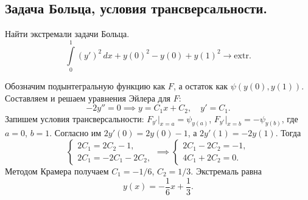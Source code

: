 \subsection{Задача Больца, условия трансверсальности.}
\begin{example}
  Найти экстремали задачи Больца. 
  \[
    \int\limits_{0}^{1} (y')^2\,dx + y(0)^2 - y(0) + y(1)^2 \to \mathrm{extr}.
  \]
\begin{solution}
  Обозначим подынтегральную функцию как $ F $, а остаток как $ \psi(y(0), y(1))
  $. Составляем и решаем уравнения Эйлера для $ F $: 
  \[
      -2y'' = 0 \implies y = C_1x+ C_2, \quad y' = C_1.
  \]
  Запишем условия трансверсальности: $ F_{y'} \big|_{x=a} = \psi_{y(a)} $, $
  F_{y'}\big|_{x=b}= -\psi_{y(b)} $,
 где $ a = 0 $, $ b = 1 $. Согласно им $ 2y'(0) = 2y(0) - 1 $, а $ 2y'(1) =
 -2y(1) $. Тогда  
 \[
     \begin{cases}
       2C_1 = 2C_2 - 1, \\
       2C_1 = -2C_1 - 2C_2,
     \end{cases} \implies
     \begin{cases}
       2C_1 - 2C_2 = -1, \\
       4C_1 + 2C_2 = 0.
     \end{cases}
 \]
Методом Крамера получаем $ C_1 = -1/6 $, $ C_2 = 1/3 $. Экстремаль равна 
\[
    \boxed{
      y(x) = - \frac{1}{6} x + \frac{1}{3}.
    }
\]
\end{solution}
\end{example}

